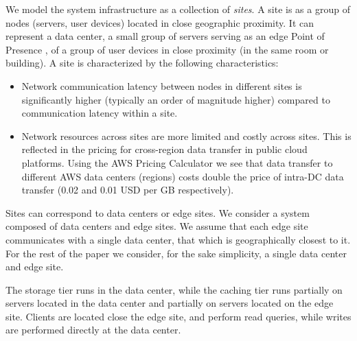 We model the system infrastructure as a collection of \textit{sites}.
A site is as a group of nodes (servers, user devices) located in close geographic proximity.
It can represent a data center, a small group of servers serving as an edge Point of Presence \cite{google:infra}, of
a group of user devices in close proximity (in the same room or building).
A site is characterized by the following characteristics:
\begin{itemize}
  \item Network communication latency between nodes in different sites is significantly higher (typically an order of
  magnitude higher) \cite{pbailis:hats} compared to communication latency within a site.
  \item Network resources across sites are more limited and costly across sites.
  This is reflected in the pricing for cross-region data transfer in public cloud platforms.
  Using the AWS Pricing Calculator \cite{aws:costcalc} we see that data transfer to different AWS data centers
  (regions) costs double the price of intra-DC data transfer (0.02 and 0.01 USD per GB respectively).
\end{itemize}

Sites can correspond to data centers or edge sites.
We consider a system composed of data centers and edge sites.
We assume that each edge site communicates with a single data center, that which is geographically
closest to it.
For the rest of the paper we consider, for the sake simplicity, a single data center and edge site.

The storage tier runs in the data center, while the caching tier runs partially on servers located in the data center
and partially on servers located on the edge site.
Clients are located close the edge site, and perform read queries, while writes are performed directly at the data
center.






